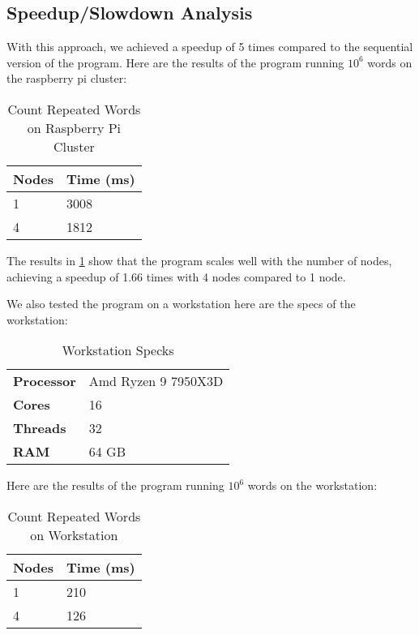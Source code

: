 \documentclass[12pt]{article}
\begin{document}
\subsection{Speedup/Slowdown Analysis}

With this approach, we achieved a speedup of 5 times compared to the sequential version of the program.
Here are the results of the program running $10^6$ words on the raspberry pi cluster:

\begin{table}[H]
  \caption{Count Repeated Words on Raspberry Pi Cluster}\label{tab:count-repeated-words}
  \begin{center}
    \begin{tabular}[c]{l|l}
      \textbf{Nodes} & \textbf{Time (ms)} \\
      \hline
      1 & 3008 \\
      4 & 1812\\
    \end{tabular}
  \end{center}
\end{table}

The results in \ref{tab:count-repeated-words} show that the program scales well with the number of nodes, achieving a speedup of 1.66 times with 4 nodes compared to 1 node.

We also tested the program on a workstation here are the specs of the workstation:

\begin{table}[H]
  \caption{Workstation Specks}\label{tab:workstation}
  \begin{center}
    \begin{tabular}[c]{l|l}
      \textbf{Processor} & Amd Ryzen 9 7950X3D \\
      \textbf{Cores} & 16 \\
      \textbf{Threads} & 32 \\
      \textbf{RAM} & 64 GB \\
    \end{tabular}
  \end{center}
\end{table}

Here are the results of the program running $10^6$ words on the workstation:

\begin{table}[H]
  \caption{Count Repeated Words on Workstation}\label{tab:count-repeated-words-workstation}
  \begin{center}
    \begin{tabular}[c]{l|l}
      \textbf{Nodes} & \textbf{Time (ms)} \\
      \hline
      1 & 210 \\
      4 & 126\\
    \end{tabular}
  \end{center}
\end{table}
\end{document}
